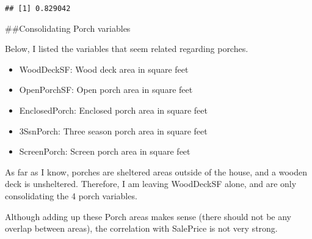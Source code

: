 \documentclass[]{article}
\newenvironment{Shaded}{\begin{snugshade}}{\end{snugshade}}
\newcommand{\DataTypeTok}[1]{\textcolor[rgb]{0.13,0.29,0.53}{#1}}
\newcommand{\DecValTok}[1]{\textcolor[rgb]{0.00,0.00,0.81}{#1}}
\newcommand{\KeywordTok}[1]{\textcolor[rgb]{0.13,0.29,0.53}{\textbf{#1}}}
\newcommand{\NormalTok}[1]{#1}
\newcommand{\OperatorTok}[1]{\textcolor[rgb]{0.81,0.36,0.00}{\textbf{#1}}}
\newcommand{\StringTok}[1]{\textcolor[rgb]{0.31,0.60,0.02}{#1}}
\begin{document}
\begin{Shaded}
\end{Shaded}

\begin{verbatim}
## [1] 0.829042
\end{verbatim}

\#\#Consolidating Porch variables

Below, I listed the variables that seem related regarding porches.

\begin{itemize}
\item
  WoodDeckSF: Wood deck area in square feet
\item
  OpenPorchSF: Open porch area in square feet
\item
  EnclosedPorch: Enclosed porch area in square feet
\item
  3SsnPorch: Three season porch area in square feet
\item
  ScreenPorch: Screen porch area in square feet
\end{itemize}

As far as I know, porches are sheltered areas outside of the house, and
a wooden deck is unsheltered. Therefore, I am leaving WoodDeckSF alone,
and are only consolidating the 4 porch variables.

\begin{Shaded}
\end{Shaded}

Although adding up these Porch areas makes sense (there should not be
any overlap between areas), the correlation with SalePrice is not very
strong.
\end{document}
